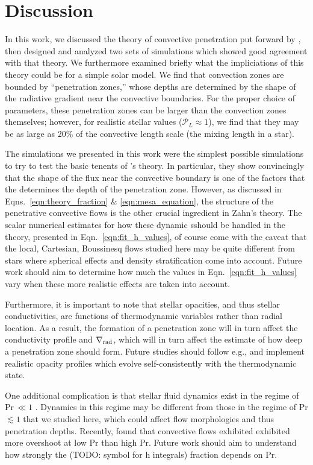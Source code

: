 \documentclass{aastex631}
\newcommand{\gradrad}{\ensuremath{\nabla_{\rm{rad}}}}
\newcommand{\mP}{\ensuremath{\mathcal{P}}}
\begin{document}
\section{Discussion}
\label{sec:discussion}
In this work, we discussed the theory of convective penetration put forward by \citet{zahn1991}, then designed and analyzed two sets of simulations which showed good agreement with that theory.
We furthermore examined briefly what the impliciations of this theory could be for a simple solar model.
We find that convection zones are bounded by ``penetration zones,'' whose depths are determined by the shape of the radiative gradient near the convective boundaries.
For the proper choice of parameters, these penetration zones can be larger than the convection zones themselves; however, for realistic stellar values ($\mP_L \approx 1$), we find that they may be as large as 20\% of the convective length scale (the mixing length in a star).

The simulations we presented in this work were the simplest possible simulations to try to test the basic tenents of \citet{zahn1991}'s theory.
In particular, they show convincingly that the shape of the flux near the convective boundary is one of the factors that the determines the depth of the penetration zone.
However, as discussed in Eqns.~\ref{eqn:theory_fraction} \& \ref{eqn:mesa_equation}, the structure of the penetrative convective flows is the other crucial ingredient in Zahn's theory.
The scalar numerical estimates for how these dynamic sshould be handled in the theory, presented in Eqn.~\ref{eqn:fit_h_values}, of course come with the caveat that the local, Cartesian, Boussinesq flows studied here may be quite different from stars where spherical effects and density stratification come into account.
Future work should aim to determine how much the values in Eqn.~\ref{eqn:fit_h_values} vary when these more realistic effects are taken into account.

Furthermore, it is important to note that stellar opacities, and thus stellar conductivities, are functions of thermodynamic variables rather than radial location.
As a result, the formation of a penetration zone will in turn affect the conductivity profile and $\gradrad$, which will in turn affect the estimate of how deep a penetration zone should form.
Future studies should follow e.g., \citet{kapyla_etal_2017, kapyla2019} and implement realistic opacity profiles which evolve self-consistently with the thermodynamic state.

One additional complication is that stellar fluid dynamics exist in the regime of Pr$\,\ll1$ \citep{garaud2021}.
Dynamics in this regime may be different from those in the regime of Pr$\lesssim 1$ that we studied here, which could affect flow morphologies and thus penetration depths.
Recently, \citet{kapyla2021} found that convective flows exhibited exhibited more overshoot at low Pr than high Pr.
Future work should aim to understand how strongly the (TODO: symbol for h integrals) fraction depends on Pr.
\end{document}
